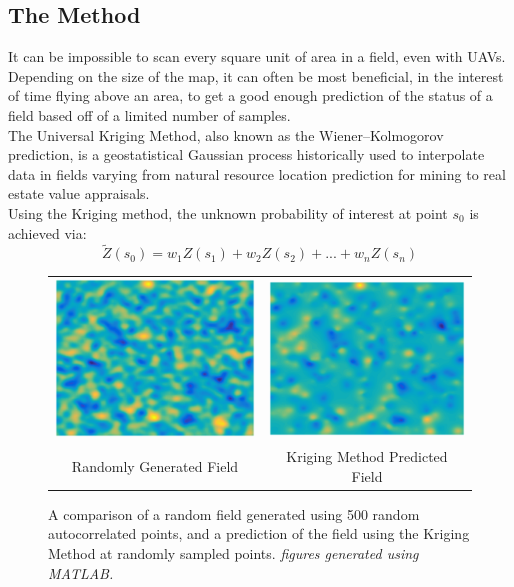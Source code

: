 \documentclass[preprint,12pt]{elsarticle}
\begin{document}
\subsection{The Method}
\noindent
It can be impossible to scan every square unit of area in a field, even with UAVs. Depending on the size of the map, it can often be most beneficial, in the interest of time flying above an area, to get a good enough prediction of the status of a field based off of a limited number of samples.\\
The Universal Kriging Method, also known as the Wiener–Kolmogorov prediction, is a geostatistical Gaussian process historically used to interpolate data in fields varying from natural resource location prediction for mining to real estate value appraisals.\\
Using the Kriging method, the unknown probability of interest at point $s_{0}$ is achieved via:
\begin{equation}
\widetilde{Z}(s_{0})=w_{1}Z(s_{1}) + w_{2}Z(s_{2}) + ... + w_{n}Z(s_{n})
\end{equation}
\begin{center}
	\begin{figure}[h]
		\begin{tabular}{cc}
			\centering
			\includegraphics[width=0.49\linewidth]{random_field.eps} &
			\includegraphics[width=0.49\linewidth]{kriging_prediction.eps} \\
			Randomly Generated Field & Kriging Method Predicted Field\\
		\end{tabular}
		\caption{A comparison of a random field generated using 500 random autocorrelated points, and a prediction of the field using the Kriging Method at randomly sampled points. \textit{figures generated using MATLAB.}}
	\end{figure}
\end{center}
\end{document}
